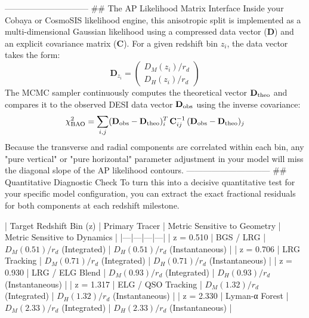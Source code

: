 ------------------------------
## The AP Likelihood Matrix Interface
Inside your Cobaya or CosmoSIS likelihood engine, this anisotropic split is implemented as a multi-dimensional Gaussian likelihood using a compressed data vector ($\mathbf{D}$) and an explicit covariance matrix ($\mathbf{C}$). For a given redshift bin $z_i$, the data vector takes the form:
$$\mathbf{D}_{z_i} = \begin{pmatrix} D_M(z_i)/r_d \\ D_H(z_i)/r_d \end{pmatrix}$$ 
The MCMC sampler continuously computes the theoretical vector $\mathbf{D}_{\rm theo}$ and compares it to the observed DESI data vector $\mathbf{D}_{\rm obs}$ using the inverse covariance:
$$\chi^2_{\rm BAO} = \sum_{i,j} (\mathbf{D}_{\rm obs} - \mathbf{D}_{\rm theo})_i^T \, \mathbf{C}_{ij}^{-1} \, (\mathbf{D}_{\rm obs} - \mathbf{D}_{\rm theo})_j$$ 
Because the transverse and radial components are correlated within each bin, any "pure vertical" or "pure horizontal" parameter adjustment in your model will miss the diagonal slope of the AP likelihood contours.
------------------------------
## Quantitative Diagnostic Check
To turn this into a decisive quantitative test for your specific model configuration, you can extract the exact fractional residuals for both components at each redshift milestone.

| Target Redshift Bin (z) | Primary Tracer | Metric Sensitive to Geometry | Metric Sensitive to Dynamics |
|---|---|---|---|
| z = 0.510 | BGS / LRG | $D_M(0.51)/r_d$ (Integrated) | $D_H(0.51)/r_d$ (Instantaneous) |
| z = 0.706 | LRG Tracking | $D_M(0.71)/r_d$ (Integrated) | $D_H(0.71)/r_d$ (Instantaneous) |
| z = 0.930 | LRG / ELG Blend | $D_M(0.93)/r_d$ (Integrated) | $D_H(0.93)/r_d$ (Instantaneous) |
| z = 1.317 | ELG / QSO Tracking | $D_M(1.32)/r_d$ (Integrated) | $D_H(1.32)/r_d$ (Instantaneous) |
| z = 2.330 | Lyman-α Forest | $D_M(2.33)/r_d$ (Integrated) | $D_H(2.33)/r_d$ (Instantaneous) |


